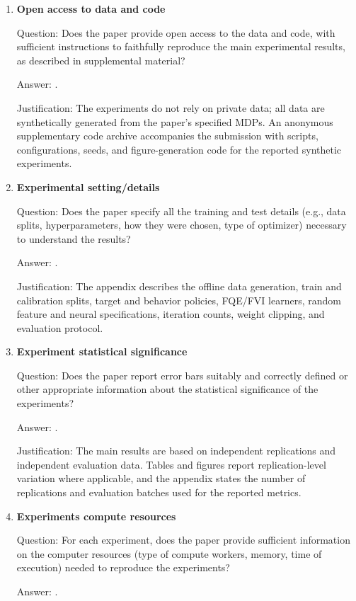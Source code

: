 \documentclass{article}
\theoremstyle{plain}
\theoremstyle{definition}
\theoremstyle{remark}
\begin{document}
\begin{enumerate}[leftmargin=5mm]
\item \textbf{Open access to data and code}

Question: Does the paper provide open access to the data and code, with
sufficient instructions to faithfully reproduce the main experimental results,
as described in supplemental material?

Answer: \answerYes{}.

Justification: The experiments do not rely on private data; all data are
synthetically generated from the paper's specified MDPs. An anonymous
supplementary code archive accompanies the submission with scripts,
configurations, seeds, and figure-generation code for the reported synthetic
experiments.

\item \textbf{Experimental setting/details}

Question: Does the paper specify all the training and test details (e.g., data
splits, hyperparameters, how they were chosen, type of optimizer) necessary to
understand the results?

Answer: \answerYes{}.

Justification: The appendix describes the offline data generation, train and
calibration splits, target and behavior policies, FQE/FVI learners, random
feature and neural specifications, iteration counts, weight clipping, and
evaluation protocol.

\item \textbf{Experiment statistical significance}

Question: Does the paper report error bars suitably and correctly defined or
other appropriate information about the statistical significance of the
experiments?

Answer: \answerYes{}.

Justification: The main results are based on independent replications and
independent evaluation data. Tables and figures report replication-level
variation where applicable, and the appendix states the number of replications
and evaluation batches used for the reported metrics.

\item \textbf{Experiments compute resources}

Question: For each experiment, does the paper provide sufficient information on
the computer resources (type of compute workers, memory, time of execution)
needed to reproduce the experiments?

Answer: \answerYes{}.


\end{enumerate}
\end{document}

